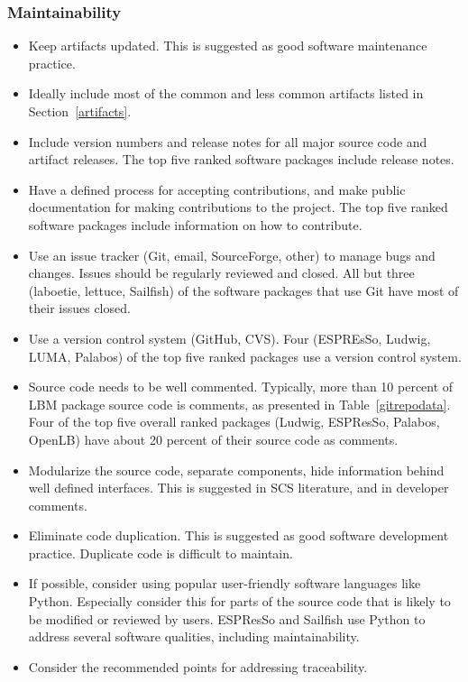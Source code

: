 \documentclass[final, 3p, times, authoryear]{elsarticle}
\begin{document}
\subsubsection{Maintainability}

\begin{itemize}
	\item Keep artifacts updated. This is suggested as good software maintenance
	practice.
	\item Ideally include most of the common and less common artifacts listed in
	Section~\ref{artifacts}.
	\item Include version numbers and release notes for all major source code
	and artifact releases. The top five ranked software packages include release
	notes.
	\item Have a defined process for accepting contributions, and make public
	documentation for making contributions to the project. The top five ranked
	software packages include information on how to contribute. 
	\item Use an issue tracker (Git, email, SourceForge, other) to manage bugs
	and changes. Issues should be regularly reviewed and closed. All but three
	(laboetie, lettuce, Sailfish) of the software packages that use Git have
	most of their issues closed.
	\item Use a version control system (GitHub, CVS). Four (ESPREsSo, Ludwig,
	LUMA, Palabos) of the top five ranked packages use a version control system.
	\item Source code needs to be well commented. Typically, more than 10
	percent of LBM package source code is comments, as presented in
	Table~\ref{gitrepodata}. Four of the top five overall ranked packages
	(Ludwig, ESPResSo, Palabos, OpenLB) have about 20 percent of their source
	code as comments.
	\item Modularize the source code, separate components, hide information
	behind well defined interfaces. This is suggested in SCS literature, and in
	developer comments.
	\item Eliminate code duplication. This is suggested as good software
	development practice. Duplicate code is difficult to maintain.
	\item If possible, consider using popular user-friendly software languages
	like Python. Especially consider this for parts of the source code that is
	likely to be modified or reviewed by users. ESPResSo and Sailfish use Python
	to address several software qualities, including maintainability.
	\item Consider the recommended points for addressing traceability.
\end{itemize}
\end{document}
